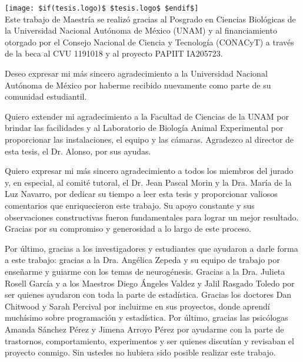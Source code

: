 \newpage
    \begin{center}
        \texttt{[image: \$if(tesis.logo)\$ \$tesis.logo\$ \$endif\$]}\\[0.5cm]
        Este trabajo de Maestría se realizó gracias al Posgrado en Ciencias Biológicas de la Universidad Nacional Autónoma de México (UNAM) y al financiamiento otorgado por el Consejo Nacional de Ciencia y Tecnología (CONACyT) a través de la beca al CVU 1191018 y al proyecto PAPIIT IA205723.

        Deseo expresar mi más sincero agradecimiento a la Universidad Nacional Autónoma de México por haberme recibido nuevamente como parte de su comunidad estudiantil. 
        
        Quiero extender mi agradecimiento a la Facultad de Ciencias de la UNAM por brindar las facilidades y al Laboratorio de Biología Animal Experimental por proporcionar las instalaciones, el equipo y las cámaras. Agradezco al director de esta tesis, el Dr. Alonso, por sus ayudas.
        
        Quiero expresar mi más sincero agradecimiento a todos los miembros del jurado y, en especial, al comité tutoral, el Dr. Jean Pascal Morin y la Dra. María de la Luz Navarro, por dedicar su tiempo a leer esta tesis y proporcionar valiosos comentarios que enriquecieron este trabajo. Su apoyo constante y sus observaciones constructivas fueron fundamentales para lograr un mejor resultado. Gracias por su compromiso y generosidad a lo largo de este proceso.
        
        Por último, gracias a los investigadores y estudiantes que ayudaron a darle forma a este trabajo: gracias a la Dra. Angélica Zepeda y su equipo de trabajo por enseñarme y guiarme con los temas de neurogénesis. Gracias a la Dra. Julieta Rosell García y a los Maestros Diego Ángeles Valdez y Jalil Rasgado Toledo por ser quienes ayudaron con toda la parte de estadística. Gracias los doctores Dan Chitwood y Sarah Percival por incluirme en sus proyectos, donde aprendí muchísimo sobre programación y estadística. Por último, gracias las psicólogas Amanda Sánchez Pérez y Jimena Arroyo Pérez por ayudarme con la parte de trastornos, comportamiento, experimentos y ser quienes discutían y revisaban el proyecto conmigo. Sin ustedes no hubiera sido posible realizar este trabajo.
    \end{center}

